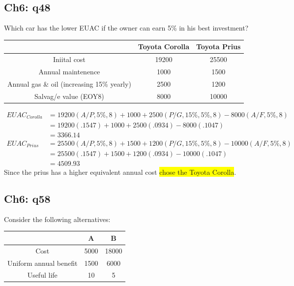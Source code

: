 \documentclass[12pt]{article}
\newcommand{\hilight}[1]{\colorbox{yellow}{#1}}
\begin{document}
\subsection*{Ch6: q48}
Which car has the lower EUAC if the owner can earn 5\% in his best investment?
\begin{center}

\begin{tabular}{c | c c}
\hline
 &\textbf{Toyota Corolla} & \textbf{Toyota Prius}\\
 \hline
Iniital cost & 19200 & 25500\\
Annual maintenence & 1000 & 1500\\
Annual gas \& oil (increasing 15\% yearly) & 2500 & 1200\\
Salvag/e value (EOY8) & 8000 & 10000\\
\hline
\end{tabular}
\end{center}
\begin{align*}
EUAC_{Corolla} &= 19200(A/P, 5\%, 8) + 1000 + 2500(P/G, 15\%, 5\%, 8) - 8000(A/F, 5\%, 8) \\
    &= 19200(.1547) + 1000 + 2500(.0934) - 8000(.1047)\\
    &= 3366.14\\
EUAC_{Prius} &= 25500(A/P, 5\%, 8) + 1500 + 1200(P/G, 15\%, 5\%, 8) - 10000(A/F, 5\%, 8) \\
    &= 25500(.1547) + 1500 + 1200(.0934) - 10000(.1047)\\
    &= 4509.93
\end{align*}
Since the prius has a higher equivalent annual cost \hilight{chose the Toyota Corolla}.

\subsection*{Ch6: q58}
Consider the following alternatives:\\
\begin{center}

\begin{tabular}{|c | c c|}
\hline
& \textbf{A} & \textbf{B}\\
\hline
Cost & 5000 & 18000\\
Uniform annual benefit & 1500 & 6000\\
Useful life &10 & 5\\
\hline
\end{tabular}
\end{center}
\end{document}
